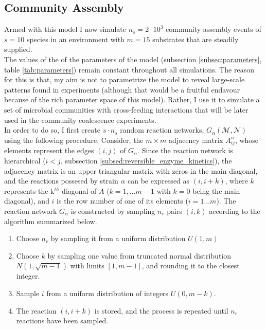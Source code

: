 \documentclass[titlepage,11pt]{article}
\begin{document}
\begin{linenumbers}
			\subsection{Community Assembly}
			Armed with this model I now simulate $ n_{s} = 2 \cdot 10^3 $ community assembly events of $ s = 10 $ species in an environment with $ m = 15 $ substrates that are steadily supplied.\\
			The values of the of the parameters of the model (subsection \ref{subsec:parameters}, table \ref{tab:parameters}) remain constant throughout all simulations. The reason for this is that, my aim is not to parametrize the model to reveal large-scale patterns found in experiments (although that would be a fruitful endavour because of the rich parameter space of this model). Rather, I use it to simulate a set of microbial communities with cross-feeding interactions that will be later used in the community coalescence experiments.\\
			In order to do so, I first create $ s \cdot n_{s}  $ random reaction networks, $ G_{\alpha}(\mathcal{M}, \mathcal{N}) $ using the following  procedure. Consider, the $ m \times m $ adjacency matrix $ A^{\alpha}_{ij} $, whose elements  represent the edges $ (i, j) $ of $ G_{\alpha}$. Since the reaction network is hierarchical ($ i < j $, subsection \ref{subsed:reversible_enzyme_kinetics}), the adjacency matrix is an upper triangular matrix with zeros in the main diagonal, and the reactions possesed by strain $ \alpha $ can be expressed as $ (i, i + k) $, where $ k $ represents the k$ ^{th} $ diagonal of $ A $ ($ k = 1, \dots m - 1 $ with $ k = 0 $ being the main diagonal), and $ i $ is the row number of one of its elements ($ i = 1 \dots m $). The reaction network $ G_{\alpha} $ is constructed by sampling $ n_{r} $ pairs $ (i , k )$ according to the algorithm summarized below.	
			\begin{enumerate}
				\item Choose $ n_{r} $ by sampling it from a uniform distribution $ U \left(1, {m}\right) $
				\item \sloppy Choose $ k $  by sampling one value from truncated normal distribution $N\left(1,  \sqrt {m - 1}\right)$ with limits $ [1, m-1] $, and rounding it to the closest integer.
				\item Sample $ i $ from a uniform distribution of integers $ U(0, m-k) $.
				\item The reaction $ (i, i + k) $ is stored, and the process is repeated until $ n_{r} $ reactions have been sampled.
			\end{enumerate}

\end{linenumbers}
\end{document}
